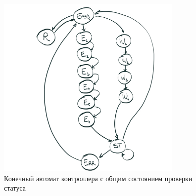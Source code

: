 \begin{figure}[H]
\centering
% 
\includegraphics[width=0.8\textwidth]{images/lab_6/fsm_common_status}
\caption{Конечный автомат контроллера  с общим состоянием проверки статуса}
\label{fig:fsm_common_status}
\end{figure}


